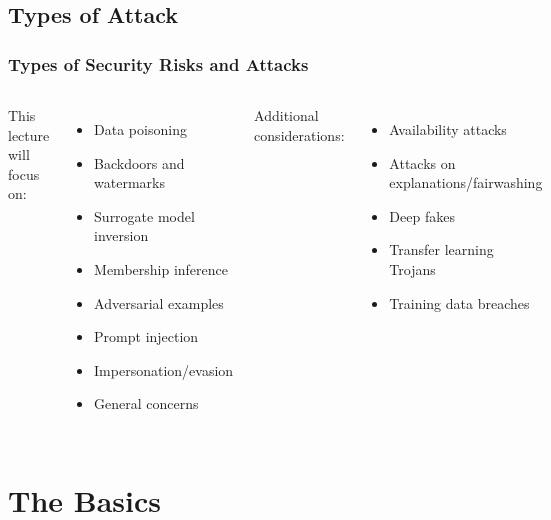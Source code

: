 \documentclass[11pt,
               aspectratio=169,
               hyperref={colorlinks}
               ]{beamer}
\begin{document}
		\subsection{Types of Attack} %
			
		\begin{frame}
		
			\frametitle{Types of Security Risks and Attacks}
			
		
				\begin{columns}[t]

					This lecture will focus on:
					\begin{itemize}
						\item Data poisoning
						\item Backdoors and watermarks
						\item Surrogate model inversion
						\item Membership inference
						\item Adversarial examples
						\item Prompt injection
						\item Impersonation/evasion 
						\item General concerns						
					\end{itemize}	

					Additional considerations:
					\begin{itemize}
						\item Availability attacks				
						\item Attacks on explanations/fairwashing
						\item Deep fakes
						\item Transfer learning Trojans	
						\item Training data breaches				
					\end{itemize}

				\end{columns}


		
					
		\end{frame}	
	
	\section{The Basics}
	
\end{document}
